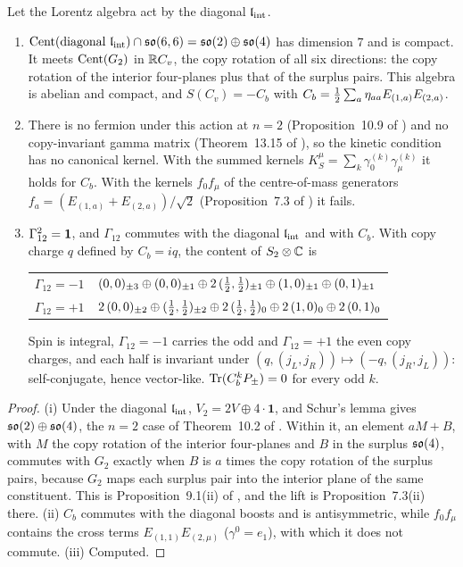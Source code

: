 \begin{proposition}
\label{e5:prop:diagonal}
Let the Lorentz algebra act by the diagonal $\mathfrak l_{\rm int}$.
\begin{enumerate}[label=(\roman*),leftmargin=2.2em]
\item $\operatorname{Cent}(\text{diagonal }\mathfrak l_{\rm int})\cap\mathfrak{so}(6,6)=\mathfrak{so}(2)\oplus\mathfrak{so}(4)$ has dimension $7$ and is compact. It meets $\operatorname{Cent}(G_2)$ in $\mathbb{R} C_v$, the copy
rotation of all six directions: the copy rotation of the interior four-planes plus that of the surplus pairs. This algebra is abelian and compact,
and $S(C_v)=-C_b$ with $C_b=\tfrac12\sum_a\eta_{aa}E_{(1,a)}E_{(2,a)}$.
\item There is no fermion under this action at $n=2$ (Proposition~10.9 of \cite{ES17}) and no copy-invariant gamma matrix (Theorem~13.15 of
\cite{ES17}), so the kinetic condition has no canonical kernel. With the summed kernels $K^\mu_S=\sum_k\gamma^{(k)}_0\gamma^{(k)}_\mu$ it holds for
$C_b$. With the kernels $f_0f_\mu$ of the centre-of-mass generators $f_a=(E_{(1,a)}+E_{(2,a)})/\sqrt2$ (Proposition~7.3 of \cite{RE}) it fails.
\item $\Gamma_{12}^2=\mathbf 1$, and $\Gamma_{12}$ commutes with the diagonal $\mathfrak l_{\rm int}$ and with $C_b$. With copy charge $q$ defined by $C_b=iq$, the content
of $S_2\otimes\mathbb{C}$ is
\begin{center}
\small
\begin{tabular}{@{}ll@{}}
\toprule
$\Gamma_{12}=-1$ & $(0,0)_{\pm3}\oplus(0,0)_{\pm1}\oplus2\,(\tfrac12,\tfrac12)_{\pm1}\oplus(1,0)_{\pm1}\oplus(0,1)_{\pm1}$\\
$\Gamma_{12}=+1$ & $2\,(0,0)_{\pm2}\oplus(\tfrac12,\tfrac12)_{\pm2}\oplus2\,(\tfrac12,\tfrac12)_0\oplus2\,(1,0)_0\oplus2\,(0,1)_0$\\
\bottomrule
\end{tabular}
\end{center}
Spin is integral, $\Gamma_{12}=-1$ carries the odd and $\Gamma_{12}=+1$ the even copy charges, and each half is invariant under
$(q,(j_L,j_R))\mapsto(-q,(j_R,j_L))$: self-conjugate, hence vector-like. $\operatorname{Tr}(C_b^kP_\pm)=0$ for every odd $k$.
\end{enumerate}
\end{proposition}

\begin{proof}
(i) Under the diagonal $\mathfrak l_{\rm int}$, $V_2=2V\oplus4\cdot\mathbf1$, and Schur's lemma gives $\mathfrak{so}(2)\oplus\mathfrak{so}(4)$, the $n=2$ case of Theorem~10.2 of
\cite{ES17}. Within it, an element $aM+B$, with $M$ the copy rotation of the interior four-planes and $B$ in the surplus $\mathfrak{so}(4)$, commutes with
$G_2$ exactly when $B$ is $a$ times the copy rotation of the surplus pairs, because $G_2$ maps each surplus pair into the interior plane of the same
constituent. This is Proposition~9.1(ii) of \cite{RE}, and the lift is Proposition~7.3(ii) there. (ii) $C_b$ commutes with the diagonal boosts and is
antisymmetric, while $f_0f_\mu$ contains the cross terms $E_{(1,1)}E_{(2,\mu)}$ ($\gamma^0=e_1$), with which it does not commute. (iii) Computed.
\end{proof}

